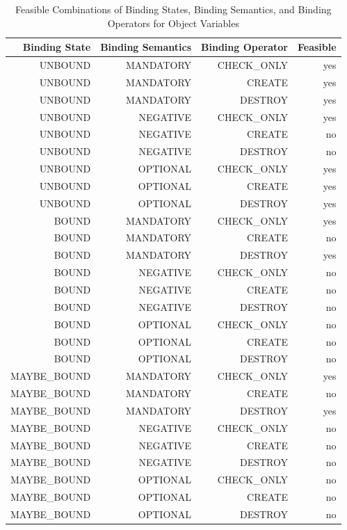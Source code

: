 \begin{table}[htbp]
  \centering
  \caption{Feasible Combinations of Binding States, Binding Semantics, and
  Binding Operators for Object Variables}
    \begin{tabular}{|r|r|r|r|}
    \hline
    \textbf{Binding State} & \textbf{Binding Semantics} & \textbf{Binding
    Operator} & \textbf{Feasible} \\
    \hline
    UNBOUND & MANDATORY & CHECK\_ONLY & yes \\
    UNBOUND & MANDATORY & CREATE & yes \\
    UNBOUND & MANDATORY & DESTROY & yes \\
    UNBOUND & NEGATIVE & CHECK\_ONLY & yes \\
    UNBOUND & NEGATIVE & CREATE & no \\
    UNBOUND & NEGATIVE & DESTROY & no \\
    UNBOUND & OPTIONAL & CHECK\_ONLY & yes \\
    UNBOUND & OPTIONAL & CREATE & yes \\
    UNBOUND & OPTIONAL & DESTROY & yes \\
    \hline
    BOUND & MANDATORY & CHECK\_ONLY & yes \\
    BOUND & MANDATORY & CREATE & no \\
    BOUND & MANDATORY & DESTROY & yes \\
    BOUND & NEGATIVE & CHECK\_ONLY & no \\
    BOUND & NEGATIVE & CREATE & no \\
    BOUND & NEGATIVE & DESTROY & no \\
    BOUND & OPTIONAL & CHECK\_ONLY & no \\
    BOUND & OPTIONAL & CREATE & no \\
    BOUND & OPTIONAL & DESTROY & no \\
    \hline
    MAYBE\_BOUND & MANDATORY & CHECK\_ONLY & yes \\
    MAYBE\_BOUND & MANDATORY & CREATE & no \\
    MAYBE\_BOUND & MANDATORY & DESTROY & yes \\
    MAYBE\_BOUND & NEGATIVE & CHECK\_ONLY & no \\
    MAYBE\_BOUND & NEGATIVE & CREATE & no \\
    MAYBE\_BOUND & NEGATIVE & DESTROY & no \\
    MAYBE\_BOUND & OPTIONAL & CHECK\_ONLY & no \\
    MAYBE\_BOUND & OPTIONAL & CREATE & no \\
    MAYBE\_BOUND & OPTIONAL & DESTROY & no \\
    \hline
    \end{tabular}%
  \label{tab:bindingCombinations}%
\end{table}%

